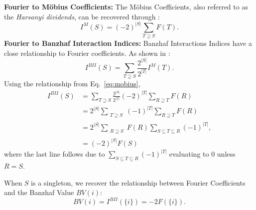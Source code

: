 \label{app:interactions}
\textbf{Fourier to M\"obius Coefficients:}
The M\"obius Coefficients, also referred to as the \emph{Harsanyi dividends}, can be recovered through \cite{saminger-platz_bases_2016}:
\begin{equation}
I^M(S) = (-2)^{|S|}\sum_{T\supseteq S}F(T).
\label{eq:mobius}
\end{equation}
\textbf{Fourier to Banzhaf Interaction Indices:} Banzhaf Interactions Indices \cite{roubens1996interaction} have a close relationship to Fourier coefficients. As shown in \cite{grabisch2000equivalent}:
\begin{equation}
    I^{BII}(S) = \sum_{T \supseteq S} \frac{2^{|S|}}{2^{|T|}}I^{M}(T).
\end{equation}
Using the relationship from Eq.~\ref{eq:mobius},
\begin{align}
    I^{BII}(S) &= \sum_{T \supseteq S} \frac{2^{|S|}}{2^{|T|}}(-2)^{|T|}\sum_{R \supseteq T}F(R) \\
    &= 2^{|S|}
    \sum_{\substack{T \supseteq S}} 
    (-1)^{|T|} \sum_{R \supseteq T}F(R)\\
    &= 2^{|S|}
    \sum_{\substack{R \supseteq S}} F(R)\sum_{S \subseteq T \subseteq R}
    (-1)^{|T|},\\
    &= (-2)^{|S|}F(S)
\end{align}
where the last line follows due to $\sum_{S \subseteq T \subseteq R}
    (-1)^{|T|}$ evaluating to 0 unless $R = S$.

When $S$ is a singleton, we recover the relationship between Fourier Coefficients and the Banzhaf Value $BV(i)$:
\begin{equation}
BV(i) = I^{BII}(\{i\}) = -2F(\{i\}).
\end{equation}

